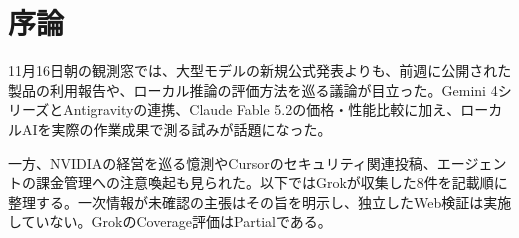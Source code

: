 \section{序論}
11月16日朝の観測窓では、大型モデルの新規公式発表よりも、前週に公開された製品の利用報告や、ローカル推論の評価方法を巡る議論が目立った。Gemini 4シリーズとAntigravityの連携、Claude Fable 5.2の価格・性能比較に加え、ローカルAIを実際の作業成果で測る試みが話題になった。

一方、NVIDIAの経営を巡る憶測やCursorのセキュリティ関連投稿、エージェントの課金管理への注意喚起も見られた。以下ではGrokが収集した8件を記載順に整理する。一次情報が未確認の主張はその旨を明示し、独立したWeb検証は実施していない。GrokのCoverage評価はPartialである。
